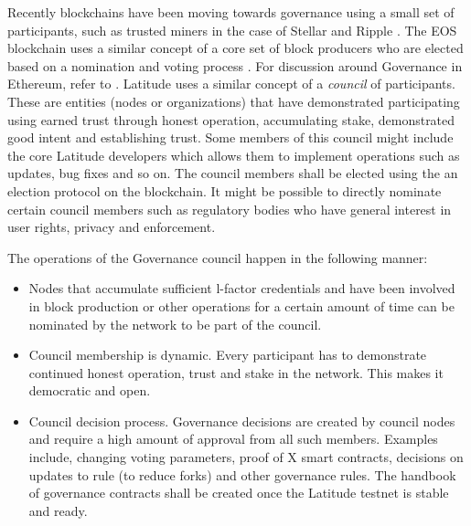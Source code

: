 Recently blockchains have been moving towards governance using a small set of participants, such as trusted miners in
the case of Stellar and Ripple \cite{stellar_gateway}. The EOS blockchain uses a similar concept of a core set of block
producers who are elected based on a nomination and voting process \cite{eos_producers}. For discussion around
Governance in Ethereum, refer to \cite{buterin_gov}. Latitude uses a similar concept of a {\em council} of participants.
These are entities (nodes or organizations) that have demonstrated participating using earned trust through honest
operation, accumulating stake, demonstrated good intent and establishing trust. Some members of this council might
include the core Latitude developers which allows them to implement operations such as updates, bug fixes and so on. The
council members shall be elected using the an election protocol on the blockchain. It might be possible to directly
nominate certain council members such as regulatory bodies who have general interest in user rights, privacy and
enforcement. 


The operations of the Governance council happen in the following manner:
\begin{itemize}
    \item Nodes that accumulate sufficient l-factor credentials and have been involved in block production or other
        operations for a certain amount of time can be nominated by the network to be part of the council. 
    \item Council membership is dynamic. Every participant has to demonstrate continued honest operation, trust and
        stake in the network. This makes it democratic and open.
    \item Council decision process. Governance decisions are created by council nodes and require a high amount of
        approval from all such members. Examples include, changing voting parameters, proof of X smart contracts,
        decisions on updates to rule (to reduce forks) and other governance rules. The handbook of governance contracts
        shall be created once the Latitude testnet is stable and ready.
\end{itemize}

